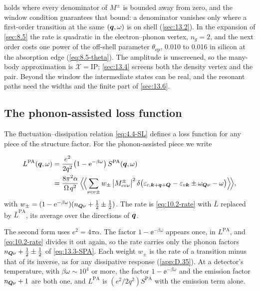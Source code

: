  holds where every denominator of $M^\pm$ is bounded away from zero, and the window condition guarantees that bound: a denominator vanishes only where a first-order transition at the same $(\bm{q},\omega)$ is on shell (\cref{sec:13.2}). In the expansion of \cref{sec:8.5} the rate is quadratic in the electron--phonon vertex, $n_g = 2$, and the next order costs one power of the off-shell parameter $\theta_{\mathrm{ep}}$, 0.010 to 0.016 in silicon at the absorption edge (\cref{eq:8.5-theta}). The amplitude is unscreened, so the many-body approximation is $\mathcal{X} = \mathrm{IP}$; \cref{sec:13.4} screens both the density vertex and the pair. Beyond the window the intermediate states can be real, and the resonant paths need the widths and the finite part of \cref{sec:13.6}.

\subsection{The phonon-assisted loss function}

The fluctuation--dissipation relation \cref{eq:4.4-SL} defines a loss function for any piece of the structure factor. For the phonon-assisted piece we write
\begin{keyresult}
\begin{equation}
  \begin{aligned}
  L^{\mathrm{PA}}(\bm{q},\omega) &= \frac{e^2}{2q^2}\bigl(1 - \mathrm{e}^{-\beta\omega}\bigr)\,S^{\mathrm{PA}}(\bm{q},\omega)\\
  &= \frac{8\pi^2\alpha}{\Omega\,q^2}\,\Bigl\langle\!\Bigl\langle\sum_{\nu cv\pm}w_\pm\,\bigl|M^\pm_{cv\nu}\bigr|^2\,\delta\bigl(\varepsilon_{c,\bm{k}+\bm{q}+\bm{Q}} - \varepsilon_{v\bm{k}} \pm \omega_{\bm{Q}\nu} - \omega\bigr)\Bigr\rangle\!\Bigr\rangle ,
  \end{aligned}
  \label{eq:13.3-LPA}
\end{equation}
with $w_\pm = (1 - \mathrm{e}^{-\beta\omega})(n_{\bm{Q}\nu} + \frac12 \pm \frac12)$. The rate is \cref{eq:10.2-rate} with $\bar L$ replaced by $\bar L^{\mathrm{PA}}$, its average over the directions of $\bm{q}$.
\end{keyresult}
\noindent The second form uses $e^2 = 4\pi\alpha$. The factor $1 - \ee^{-\beta\omega}$ appears once, in $L^{\mathrm{PA}}$, and \cref{eq:10.2-rate} divides it out again, so the rate carries only the phonon factors $n_{\bm{Q}\nu} + \frac12 \pm \frac12$ of \cref{eq:13.3-SPA}. Each weight $w_\pm$ is the rate of a transition minus that of its inverse, as for any dissipative response (\cref{app:D.35}). At a detector's temperature, with $\beta\omega \sim 10^4$ or more, the factor $1 - \ee^{-\beta\omega}$ and the emission factor $n_{\bm{Q}\nu} + 1$ are both one, and $L^{\mathrm{PA}}$ is $(e^2/2q^2)S^{\mathrm{PA}}$ with the emission term alone.

